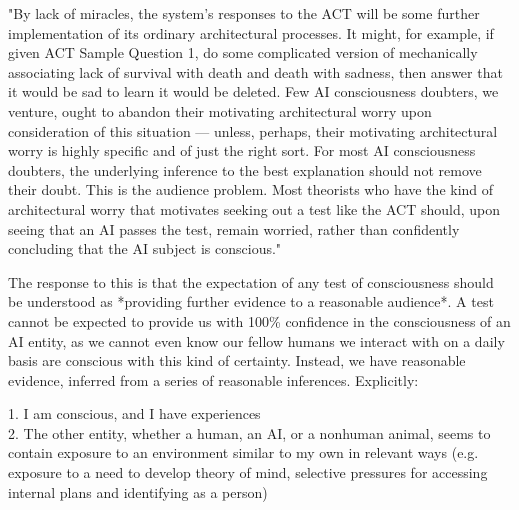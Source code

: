 \documentclass{article}
\begin{document}
"By lack of miracles, the system’s responses to the ACT will be some further implementation of its ordinary architectural processes.  It might, for example, if given ACT Sample Question 1, do some complicated version of mechanically associating lack of survival with death and death with sadness, then answer that it would be sad to learn it would be deleted.  Few AI consciousness doubters, we venture, ought to abandon their motivating architectural worry upon consideration of this situation — unless, perhaps, their motivating architectural worry is highly specific and of just the right sort.  For most AI consciousness doubters, the underlying inference to the best explanation should not remove their doubt.  This is the audience problem.  Most theorists who have the kind of architectural worry that motivates seeking out a test like the ACT should, upon seeing that an AI passes the test, remain worried, rather than confidently concluding that the AI subject is conscious."

The response to this is that the expectation of any test of consciousness should be understood as *providing further evidence to a reasonable audience*. A test cannot be expected to provide us with 100\% confidence in the consciousness of an AI entity, as we cannot even know our fellow humans we interact with on a daily basis are conscious with this kind of certainty. Instead, we have reasonable evidence, inferred from a series of reasonable inferences. Explicitly:

1. I am conscious, and I have experiences\\

2. The other entity, whether a human, an AI, or a nonhuman animal, seems to contain exposure to an environment similar to my own in relevant ways (e.g. exposure to a need to develop theory of mind, selective pressures for accessing internal plans and identifying as a person)\\
\end{document}
